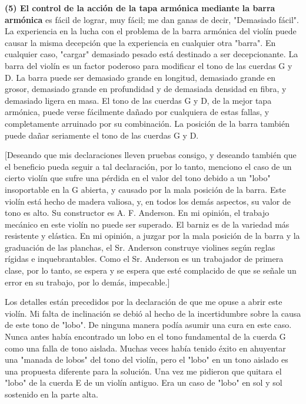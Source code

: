 \documentclass[12pt]{book}
\begin{document}
\textbf{(5) El control de la acción de la tapa armónica mediante la barra armónica} es fácil de lograr, muy fácil; me dan ganas de decir, "Demasiado fácil". La experiencia en la lucha con el problema de la barra armónica del violín puede causar la misma decepción que la experiencia en cualquier otra "barra". En cualquier caso, "cargar" demasiado pesado está destinado a ser decepcionante. La barra del violín es un factor poderoso para modificar el tono de las cuerdas G y D. La barra puede ser demasiado grande en longitud, demasiado grande en grosor, demasiado grande en profundidad y de demasiada densidad en fibra, y demasiado ligera en masa. El tono de las cuerdas G y D, de la mejor tapa armónica, puede verse fácilmente dañado por cualquiera de estas fallas, y completamente arruinado por su combinación. La posición de la barra también puede dañar seriamente el tono de las cuerdas G y D.

[Deseando que mis declaraciones lleven pruebas consigo, y deseando también que el beneficio pueda seguir a tal declaración, por lo tanto, menciono el caso de un cierto violín que sufre una pérdida en el valor del tono debido a un "lobo" insoportable en la G abierta, y causado por la mala posición de la barra. Este violín está hecho de madera valiosa, y, en todos los demás aspectos, su valor de tono es alto. Su constructor es A. F. Anderson. En mi opinión, el trabajo mecánico en este violín no puede ser superado. El barniz es de la variedad más resistente y elástica. En mi opinión, a juzgar por la mala posición de la barra y la graduación de las planchas, el Sr. Anderson construye violines según reglas rígidas e inquebrantables. Como el Sr. Anderson es un trabajador de primera clase, por lo tanto, se espera y se espera que esté complacido de que se señale un error en su trabajo, por lo demás, impecable.]

Los detalles están precedidos por la declaración de que me opuse a abrir este violín. Mi falta de inclinación se debió al hecho de la incertidumbre sobre la causa de este tono de "lobo". De ninguna manera podía asumir una cura en este caso. Nunca antes había encontrado un lobo en el tono fundamental de la cuerda G como una falla de tono aislada. Muchas veces había tenido éxito en ahuyentar una "manada de lobos" del tono del violín, pero el "lobo" en un tono aislado es una propuesta diferente para la solución. Una vez me pidieron que quitara el "lobo" de la cuerda E de un violín antiguo. Era un caso de "lobo" en sol y sol sostenido en la parte alta.
\end{document}
